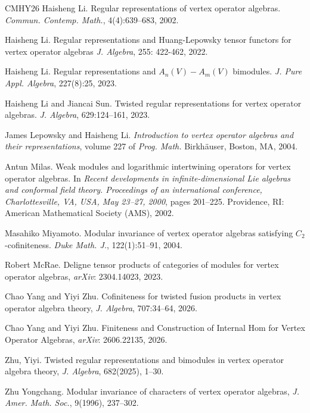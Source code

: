 \documentclass[12pt, english]{article}
\numberwithin{equation}{section}
\theoremstyle{plain}
\theoremstyle{definition}
\theoremstyle{remark}
\begin{document}
\begin{thebibliography}{CMHY26}
		Haisheng Li.
		\newblock Regular representations of vertex operator algebras.
		\newblock \emph{Commun. Contemp. Math.}, 4(4):639--683, 2002.
		
		Haisheng Li.
		\newblock Regular representations and Huang-Lepowsky tensor functors for vertex operator algebras
		\newblock \emph{J. Algebra}, 255: 422-462, 2022.
		
		Haisheng Li.
		\newblock Regular representations and {{$A_n(V)-A_m(V)$}} bimodules.
		\newblock \emph{J. Pure Appl. Algebra}, 227(8):25, 2023.
		
		Haisheng Li and Jiancai Sun.
		\newblock Twisted regular representations for vertex operator algebras.
		\newblock \emph{J. Algebra}, 629:124--161, 2023.
		
		James Lepowsky and Haisheng Li.
		\newblock \emph{Introduction to vertex operator algebras and their representations}, volume 227 of \emph{Prog. Math.}
		\newblock Birkh{\"a}user, Boston, MA, 2004.
		
		Antun Milas.
		\newblock Weak modules and logarithmic intertwining operators for vertex operator algebras.
		\newblock In \emph{Recent developments in infinite-dimensional Lie algebras and conformal field theory. Proceedings of an international conference, Charlottesville, VA, USA, May 23--27, 2000}, pages 201--225. Providence, RI: American Mathematical Society (AMS), 2002.
		
		
		Masahiko Miyamoto.
		\newblock Modular invariance of vertex operator algebras satisfying {$C_2$}-cofiniteness.
		\newblock \emph{Duke Math. J.}, 122(1):51--91, 2004.
		
		Robert McRae.  Deligne tensor products of categories of modules for vertex operator algebras, \emph{arXiv}: 2304.14023, 2023.
		
		Chao Yang and Yiyi Zhu.
		\newblock Cofiniteness for twisted fusion products in vertex operator algebra theory,
		\newblock \emph{J. Algebra}, 707:34--64, 2026.
		
		Chao Yang and Yiyi Zhu.
		\newblock Finiteness and Construction of Internal Hom for Vertex Operator Algebras,
		\newblock \emph{arXiv}: 2606.22135, 2026.
		
		Zhu, Yiyi.
		\newblock Twisted regular representations and bimodules in vertex operator algebra theory,
		\newblock \emph{J. Algebra}, 682(2025), 1--30.
		
		Zhu Yongchang.
		\newblock Modular invariance of characters of vertex operator algebras,
		\newblock  \emph{J. Amer. Math. Soc.}, 9(1996), 237--302.
		
	\end{thebibliography}
	
\end{document}
